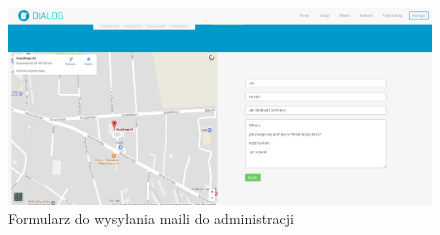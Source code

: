 \begin{figure}[h]
	\centering\includegraphics[scale=0.3]{images/email_module.jpg}
	\caption{Formularz do wysyłania maili do administracji}
	\label{Rys:email_module}
\end{figure}

